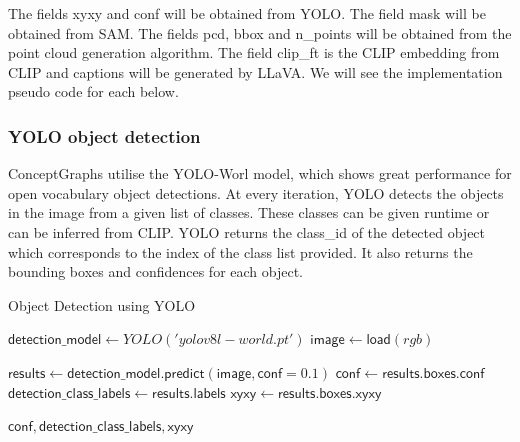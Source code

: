 The fields xyxy and conf will be obtained from YOLO. The field mask will be obtained from SAM.
The fields pcd, bbox and n\_points will be obtained from the point cloud generation algorithm. The field clip\_ft is the 
CLIP embedding from CLIP and captions will be generated by LLaVA. We will see the implementation pseudo code for each below.

\subsubsection{YOLO object detection}
ConceptGraphs utilise the YOLO-Worl model, which shows great performance for open vocabulary object detections. At every iteration, YOLO detects the objects in the image
 from a given list of classes. These classes can be given runtime or can be inferred from CLIP. YOLO returns the class\_id of the detected object which corresponds to the index of the class list provided.
 It also returns the bounding boxes and confidences for each object. 
 \begin{Algorithmus}
  \caption{Object Detection using YOLO}
  \label{alg:get_object_detections}
  \begin{algorithmic}
      \State $\mathsf{detection\_model} \gets YOLO('yolov8l-world.pt')$
      \State $\mathsf{image} \gets \mathsf{load(\textit{rgb})}$ 
      
      \State $\mathsf{results} \gets \mathsf{detection\_model.predict(image, conf=0.1)}$    
      \State $\mathsf{conf} \gets \mathsf{results.boxes.conf}$    
      \State $\mathsf{detection\_class\_labels} \gets \mathsf{results.labels}$  
      \State $\mathsf{xyxy} \gets \mathsf{results.boxes.xyxy}$   
      
      \State \Return $\mathsf{conf, detection\_class\_labels, xyxy}$
    \EndProcedure
  \end{algorithmic}
\end{Algorithmus}


